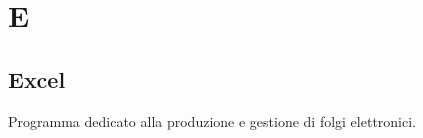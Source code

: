 \section{E}
\subsection{Excel}%
Programma dedicato alla produzione e gestione di folgi elettronici.
\clearpage